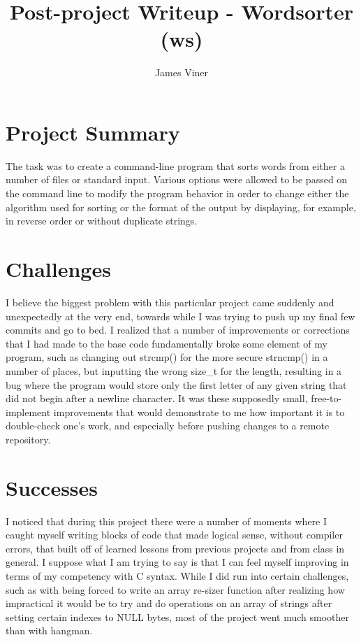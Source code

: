 \documentclass[11pt]{report}
\begin{document}
\title{Post-project Writeup - Wordsorter (ws)}
\author{James Viner}
\date{} %

\maketitle

\section*{Project Summary}
The task was to create a command-line program that sorts words from either a number of files or standard input. Various options were allowed to be passed on the command line to modify the program behavior in order to change either the algorithm used for sorting or the format of the output by displaying, for example, in reverse order or without duplicate strings.
\section*{Challenges}
I believe the biggest problem with this particular project came suddenly and unexpectedly at the very end, towards while I was trying to push up my final few commits and go to bed. I realized that a number of improvements or corrections that I had made to the base code fundamentally broke some element of my program, such as changing out strcmp() for the more secure strncmp() in a number of places, but inputting the wrong size\_t for the length, resulting in a bug where the program would store only the first letter of any given string that did not begin after a newline character. It was these supposedly small, free-to-implement improvements that would demonstrate to me how important it is to double-check one's work, and especially before pushing changes to a remote repository.
\section*{Successes}
I noticed that during this project there were a number of moments where I caught myself writing blocks of code that made logical sense, without compiler errors, that built off of learned lessons from previous projects and from class in general. I suppose what I am trying to say is that I can feel myself improving in terms of my competency with C syntax. While I did run into certain challenges, such as with being forced to write an array re-sizer function after realizing how impractical it would be to try and do operations on an array of strings after setting certain indexes to NULL bytes, most of the project went much smoother than with hangman.
\end{document}
